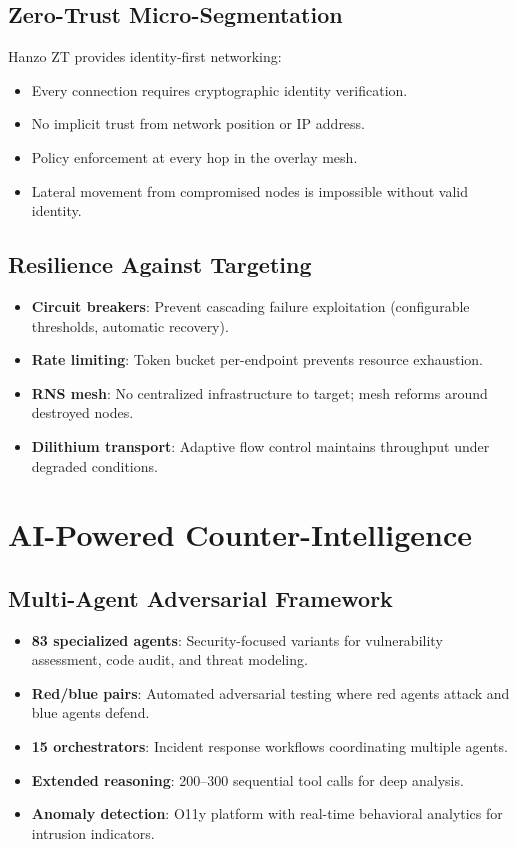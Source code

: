 \documentclass[11pt,letterpaper]{article}
\begin{document}
\subsection{Zero-Trust Micro-Segmentation}

Hanzo ZT provides identity-first networking:
\begin{itemize}
\item Every connection requires cryptographic identity verification.
\item No implicit trust from network position or IP address.
\item Policy enforcement at every hop in the overlay mesh.
\item Lateral movement from compromised nodes is impossible without valid identity.
\end{itemize}

\subsection{Resilience Against Targeting}

\begin{itemize}
\item \textbf{Circuit breakers}: Prevent cascading failure exploitation (configurable thresholds, automatic recovery).
\item \textbf{Rate limiting}: Token bucket per-endpoint prevents resource exhaustion.
\item \textbf{RNS mesh}: No centralized infrastructure to target; mesh reforms around destroyed nodes.
\item \textbf{Dilithium transport}: Adaptive flow control maintains throughput under degraded conditions.
\end{itemize}

\section{AI-Powered Counter-Intelligence}

\subsection{Multi-Agent Adversarial Framework}

\begin{itemize}
\item \textbf{83 specialized agents}: Security-focused variants for vulnerability assessment, code audit, and threat modeling.
\item \textbf{Red/blue pairs}: Automated adversarial testing where red agents attack and blue agents defend.
\item \textbf{15 orchestrators}: Incident response workflows coordinating multiple agents.
\item \textbf{Extended reasoning}: 200--300 sequential tool calls for deep analysis.
\item \textbf{Anomaly detection}: O11y platform with real-time behavioral analytics for intrusion indicators.
\end{itemize}
\end{document}
